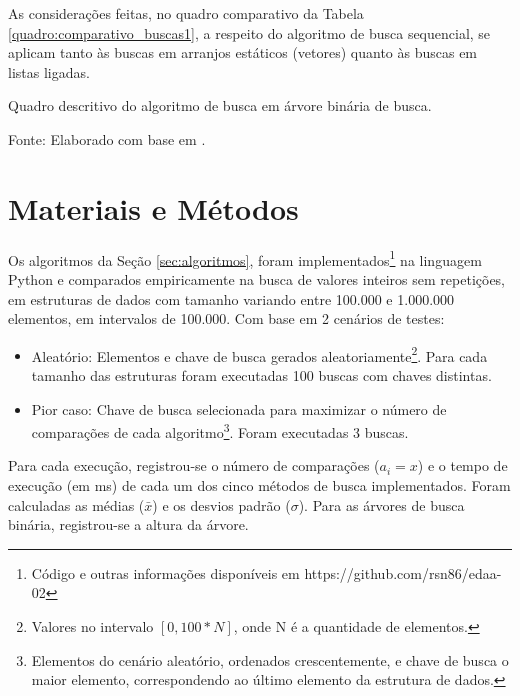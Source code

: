 \documentclass[12pt]{article}
\begin{document}
As considerações feitas, no quadro comparativo da Tabela \ref{quadro:comparativo_buscas1}, a respeito do algoritmo de busca sequencial, se aplicam tanto às buscas em arranjos estáticos (vetores) quanto às buscas em listas ligadas.

\begin{table}[h]
    \centering
    \resizebox{\textwidth}{!}{
        
    }
    \caption{Quadro descritivo do algoritmo de busca em árvore binária de busca.}
    \small{Fonte: Elaborado com base em \cite{goodrich_algorithm_2015}.}
    \label{quadro:comparativo_buscas2}
\end{table}

\section{Materiais e Métodos}

Os algoritmos da Seção \ref{sec:algoritmos}, foram implementados\footnote{Código e outras informações disponíveis em https://github.com/rsn86/edaa-02} na linguagem Python e comparados empiricamente na busca de valores inteiros sem repetições, em estruturas de dados com tamanho variando entre 100.000 e 1.000.000 elementos, em intervalos de 100.000. Com base em 2 cenários de testes:
\begin{itemize}
    \item Aleatório: Elementos e chave de busca gerados aleatoriamente\footnote{Valores no intervalo $[0, 100 * N]$, onde N é a quantidade de elementos.}. Para cada tamanho das estruturas foram executadas 100 buscas com chaves distintas.
    \item Pior caso: Chave de busca selecionada para maximizar o número de comparações de cada algoritmo\footnote{Elementos do cenário aleatório, ordenados crescentemente, e chave de busca o maior elemento, correspondendo ao último elemento da estrutura de dados.}. Foram executadas 3 buscas.
\end{itemize}

Para cada execução, registrou-se o número de comparações ($a_{i} = x$) e o tempo de execução (em ms) de cada um dos cinco métodos de busca implementados. Foram calculadas as médias ($\bar{x}$) e os desvios padrão ($\sigma$). Para as árvores de busca binária, registrou-se a altura da árvore.
\end{document}

